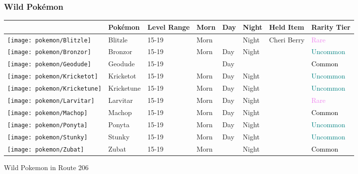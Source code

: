 \subsubsection{Wild Pokémon}%
\label{ssubsec:WildPokmon}%
\begin{longtable}{||l l l l l l l l||}%
\hline%
&Pokémon&Level Range&Morn&Day&Night&Held Item&Rarity Tier\\%
\hline%
\endhead%
\hline%
\texttt{[image: pokemon/Blitzle]}&Blitzle&15{-}19&Morn&&Night&Cheri Berry&\textcolor{violet}{%
Rare%
}\\%
\hline%
\texttt{[image: pokemon/Bronzor]}&Bronzor&15{-}19&Morn&Day&Night&&\textcolor{teal}{%
Uncommon%
}\\%
\hline%
\texttt{[image: pokemon/Geodude]}&Geodude&15{-}19&&Day&&&\textcolor{black}{%
Common%
}\\%
\hline%
\texttt{[image: pokemon/Kricketot]}&Kricketot&15{-}19&Morn&Day&Night&&\textcolor{teal}{%
Uncommon%
}\\%
\hline%
\texttt{[image: pokemon/Kricketune]}&Kricketune&15{-}19&Morn&Day&Night&&\textcolor{teal}{%
Uncommon%
}\\%
\hline%
\texttt{[image: pokemon/Larvitar]}&Larvitar&15{-}19&Morn&Day&Night&&\textcolor{violet}{%
Rare%
}\\%
\hline%
\texttt{[image: pokemon/Machop]}&Machop&15{-}19&Morn&Day&Night&&\textcolor{black}{%
Common%
}\\%
\hline%
\texttt{[image: pokemon/Ponyta]}&Ponyta&15{-}19&Morn&Day&Night&&\textcolor{teal}{%
Uncommon%
}\\%
\hline%
\texttt{[image: pokemon/Stunky]}&Stunky&15{-}19&Morn&Day&Night&&\textcolor{teal}{%
Uncommon%
}\\%
\hline%
\texttt{[image: pokemon/Zubat]}&Zubat&15{-}19&Morn&&Night&&\textcolor{black}{%
Common%
}\\%
\hline%
\end{longtable}%
\caption{Wild Pokemon in Route 206}